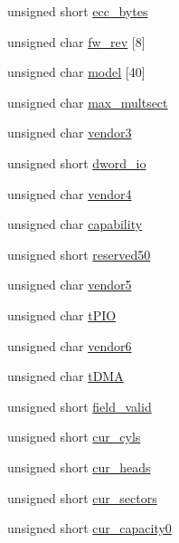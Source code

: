 \begin{DoxyCompactItemize}
unsigned short \hyperlink{structident__device__t_af5aba8d177b13759ad10593aefef75de}{ecc\+\_\+bytes}
\item 
unsigned char \hyperlink{structident__device__t_a17cf9b96ebf881a367f7c4807d9e4ebc}{fw\+\_\+rev} \mbox{[}8\mbox{]}
\item 
unsigned char \hyperlink{structident__device__t_a04219740c47641a652b946bd7bbcdaf6}{model} \mbox{[}40\mbox{]}
\item 
unsigned char \hyperlink{structident__device__t_a8238d2f55c2d2f68ccdf0e20029fe636}{max\+\_\+multsect}
\item 
unsigned char \hyperlink{structident__device__t_a3812ae5e744328c081f25c0f4ecaec63}{vendor3}
\item 
unsigned short \hyperlink{structident__device__t_a8105ba5d1d0794158b141ddba3b396c4}{dword\+\_\+io}
\item 
unsigned char \hyperlink{structident__device__t_a1484d43f0a155e4fb3efa6d00eadc0d1}{vendor4}
\item 
unsigned char \hyperlink{structident__device__t_a7d02a0251de92f8bfcde9254fae00d51}{capability}
\item 
unsigned short \hyperlink{structident__device__t_ae77410f26a7ef148d5d17fb5a068f135}{reserved50}
\item 
unsigned char \hyperlink{structident__device__t_aa37d90e0a3dbaf28b2b20ee7a792ca37}{vendor5}
\item 
unsigned char \hyperlink{structident__device__t_a98aef15c0899c883fad89b60d712d4cb}{t\+P\+IO}
\item 
unsigned char \hyperlink{structident__device__t_a51b7a29370473491cdad8e6fbafce21a}{vendor6}
\item 
unsigned char \hyperlink{structident__device__t_a06c2602918273e7e0b9163eeb9fa68e3}{t\+D\+MA}
\item 
unsigned short \hyperlink{structident__device__t_ae127ec2092115637970e5993909d6c02}{field\+\_\+valid}
\item 
unsigned short \hyperlink{structident__device__t_a5d2e9e636ff4e9fa7b73d52411c94e9c}{cur\+\_\+cyls}
\item 
unsigned short \hyperlink{structident__device__t_a35e272894045c082fa9b34630b270d2c}{cur\+\_\+heads}
\item 
unsigned short \hyperlink{structident__device__t_ae4e4455f7d44a28f3d2d914739ba73ed}{cur\+\_\+sectors}
\item 
unsigned short \hyperlink{structident__device__t_a15f93e46e5a465a66e1116bb4ebacd44}{cur\+\_\+capacity0}
\item 

\end{DoxyCompactItemize}

